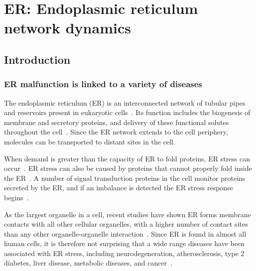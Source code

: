 \chapter{ER: Endoplasmic reticulum network dynamics} \label{chap:ER}



\ifpdf
    \graphicspath{{Chapter5/Figs/Raster/}{Chapter5/Figs/PDF/}{Chapter5/Figs/}}
\else
    \graphicspath{{Chapter5/Figs/Vector/}{Chapter5/Figs/}}
\fi

%

\section{Introduction} 
\subsection{ER malfunction is linked to a variety of diseases}
The endoplasmic reticulum (ER) is an interconnected network of tubular pipes and reservoirs present in eukaryotic cells~\cite{alberts2002molecular}.
Its function includes the biogenesis of membrane and secretory proteins, and delivery of these functional solutes throughout the cell~\cite{dyson1978cell}.
Since the ER network extends to the cell periphery, molecules can be transported to distant sites in the cell.

When demand is greater than the capacity of ER to fold proteins, ER stress can occur~\cite{oakes2015role}.
ER stress can also be caused by proteins that cannot properly fold inside the ER~\cite{rao2004misfolded}.
A number of signal transduction proteins in the cell monitor proteins secreted by the ER, and if an imbalance is detected the ER stress response begins~\cite{oakes2015role}.

As the largest organelle in a cell, recent studies have shown ER forms membrane contacts with all other cellular organelles, with a higher number of contact sites than any other organelle-organelle interaction~\cite{phillips2016structure, valm2017applying}. 
Since ER is found in almost all human cells, it is therefore not surprising that a wide range diseases have been associated with ER stress, including neurodegeneration, atherosclerosis, type 2 diabetes, liver disease, metabolic diseases, and cancer~\cite{oakes2015role, ozcan2012role}.


